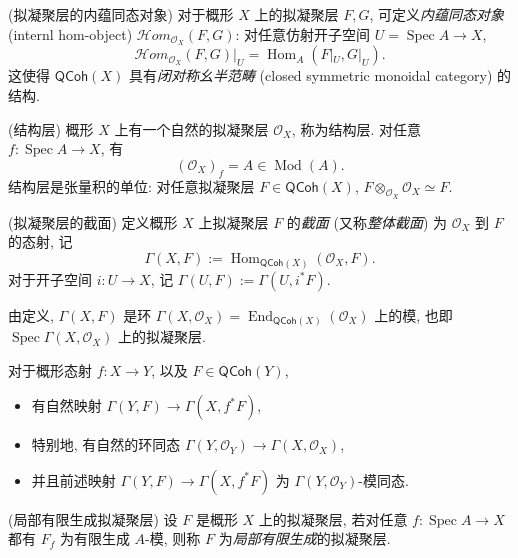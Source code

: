 \documentclass{book}
\newcommand{\internalhom}{\mathcal{H}om}
\newcommand{\todo}[1]{{\color{blue}\fbox{TODO: \textbf{#1}}}}
\begin{document}
	\begin{definition}
		[label={qcoh-inner-hom}]
		{(拟凝聚层的内蕴同态对象)}
		对于概形 $X$ 上的拟凝聚层 $F,G$, 可定义\emph{内蕴同态对象} (internl hom-object) $\internalhom_{\mathcal O_X}(F,G)$: 对任意仿射开子空间 $U=\operatorname{Spec} A \to X$,
		$$
		\internalhom_{\mathcal O_X}(F,G)|_U = \operatorname{Hom}_{A}(F|_U,G|_U).
		$$
		这使得 $\mathsf{QCoh}(X)$ 具有\emph{闭对称幺半范畴} (closed symmetric monoidal category) 的结构.
	\end{definition}
	
	\begin{example}
		{(结构层)}
		概形 $X$ 上有一个自然的拟凝聚层 $\mathcal O_X$, 称为结构层. 对任意 $f\colon \operatorname{Spec} A\to X$, 有 $$(\mathcal O_X)_f = A\in\operatorname{Mod}(A).$$
		结构层是张量积的单位: 对任意拟凝聚层 $F\in\mathsf{QCoh}(X)$, $F\otimes_{\mathcal O_X}\mathcal O_X\simeq F$.
	\end{example}
	
	
	\begin{definition}
		[label={qcoh-section}]
		{(拟凝聚层的截面)}
		定义概形 $X$ 上拟凝聚层 $F$ 的\emph{截面} (又称\emph{整体截面}) 为 $\mathcal O_X$ 到 $F$ 的态射, 记
		$$
		\Gamma(X,F) := \operatorname{Hom}_{\mathsf{QCoh}(X)}(\mathcal O_X,F).
		$$
		对于开子空间 $i\colon U\to X$, 记 $\Gamma(U,F):=\Gamma(U,i^*F)$.
	\end{definition}
	
	由定义, $\Gamma(X,F)$ 是环 $\Gamma(X,\mathcal O_X)=\operatorname{End}_{\mathsf{QCoh}(X)}(\mathcal O_X)$ 上的模, 也即 $\operatorname{Spec} \Gamma(X,\mathcal O_X)$ 上的拟凝聚层.
	

	\begin{prop}
		[label={global-section-functoriality-on-scheme}]
		{}
		对于概形态射 $f\colon X\to Y$, 以及 $F\in\mathsf{QCoh}(Y)$,
		\begin{itemize}
			\item 有自然映射 $\Gamma(Y,F) \to \Gamma(X,f^*F)$,
			\item 特别地, 有自然的环同态
			$\Gamma(Y,\mathcal O_Y) \to \Gamma(X,\mathcal O_X)$,
			\item 并且前述映射 $\Gamma(Y,F) \to \Gamma(X,f^*F)$ 为 $\Gamma(Y,\mathcal O_Y)$-模同态.
		\end{itemize}
	\end{prop}
	
	
	\begin{definition}
		{(局部有限生成拟凝聚层)}
		设 $F$ 是概形 $X$ 上的拟凝聚层, 若对任意 $f\colon \operatorname{Spec} A\to X$ 都有 $F_f$ 为有限生成 $A$-模, 则称 $F$ 为\emph{局部有限生成}的拟凝聚层.
	\end{definition}
	
\end{document}
